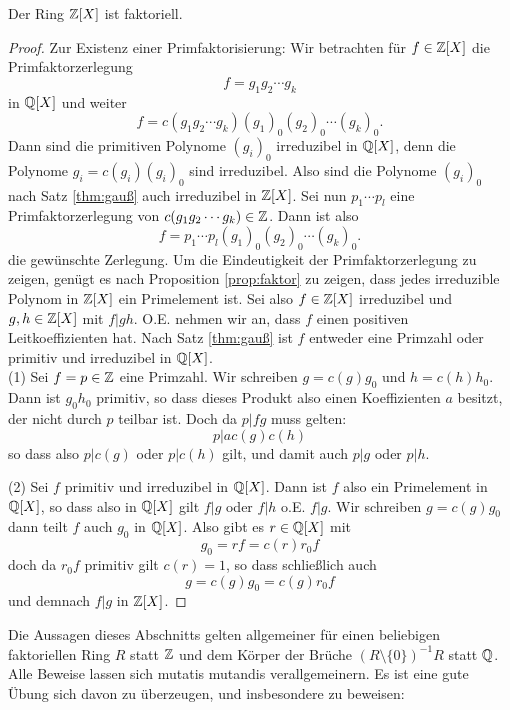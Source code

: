 \documentclass{book}
\begin{document}
\begin{thm}
    \label{thm:zxfaktoriell}
    Der Ring $\mathbb{Z}[X]$ ist faktoriell.
\end{thm}
\begin{proof}
    Zur Existenz einer Primfaktorisierung: Wir betrachten für $f \in \mathbb{Z}[X]$ die Primfaktorzerlegung
    \[
        f  = g_1 g_2 \cdots g_k
    \]
    in $\mathbb{Q}[X]$ und weiter
    \[
        f  = c(g_1 g_2 \cdots g_k) (g_1)_0 (g_2)_0 \cdots (g_k)_0.
    \]
    Dann sind die primitiven Polynome $(g_i)_0$ irreduzibel in $\mathbb{Q}[X]$, denn
    die Polynome $g_i = c(g_i) (g_i)_0$ sind irreduzibel. Also sind die
    Polynome $(g_i)_0$ nach Satz \ref{thm:gauß} auch irreduzibel in $\mathbb{Z}[X]$.
    Sei nun $p_1 \cdots p_l$ eine Primfaktorzerlegung von $c(g_1 g_2 \cdots
    g_k) \in \mathbb{Z}$. Dann ist also 
    \[
        f = p_1 \cdots p_l (g_1)_0 (g_2)_0 \cdots (g_k)_0.
    \]
    die gewünschte Zerlegung. Um die Eindeutigkeit der Primfaktorzerlegung zu
    zeigen, genügt es nach Proposition \ref{prop:faktor} zu zeigen, dass jedes
    irreduzible Polynom in $\mathbb{Z}[X]$ ein Primelement ist. Sei also $f \in
    \mathbb{Z}[X]$ irreduzibel und $g,h \in \mathbb{Z}[X]$ mit $f | gh$. O.E. nehmen wir an,
    dass $f$ einen positiven Leitkoeffizienten hat. Nach Satz \ref{thm:gauß}
    ist $f$ entweder eine Primzahl oder primitiv und irreduzibel in $\mathbb{Q}[X]$.\\

    \noindent
    (1) Sei $f=p \in \mathbb{Z}$ eine Primzahl. Wir schreiben $g = c(g) g_0$ und $h = c(h) h_0$.
    Dann ist $g_0 h_0$ primitiv, so dass dieses Produkt also einen
    Koeffizienten $a$ besitzt, der nicht durch $p$ teilbar ist. Doch da $p | fg$ muss gelten:
    \[
        p | a c(g)c(h)
    \]
    so dass also $p| c(g)$ oder $p | c(h)$ gilt, und damit auch $p | g$ oder $p | h$. 
    
    \noindent
    (2) Sei $f$ primitiv und irreduzibel in $\mathbb{Q}[X]$. Dann ist $f$ also ein
    Primelement in $\mathbb{Q}[X]$, so dass also in $\mathbb{Q}[X]$ gilt $f | g$ oder $f | h$
    o.E. $f | g$. Wir schreiben $g = c(g) g_0$ dann teilt $f$ auch $g_0$ in
    $\mathbb{Q}[X]$. Also gibt es $r \in \mathbb{Q}[X]$ mit 
    \[
        g_0 = rf = c(r) r_0 f
    \]
    doch da $r_0 f$ primitiv gilt $c(r) = 1$, so dass schließlich auch 
    \[
        g = c(g) g_0 = c(g) r_0 f
    \]
    und demnach $f | g$ in $\mathbb{Z}[X]$. 
\end{proof}

Die Aussagen dieses Abschnitts gelten allgemeiner für einen beliebigen
faktoriellen Ring $R$ statt $\mathbb{Z}$ und dem Körper der Brüche $(R \setminus \{0
\})^{-1}R$ statt $\mathbb{Q}$. Alle Beweise lassen sich mutatis mutandis
verallgemeinern. Es ist eine gute Übung sich davon zu überzeugen, und
insbesondere zu beweisen:
\end{document}
